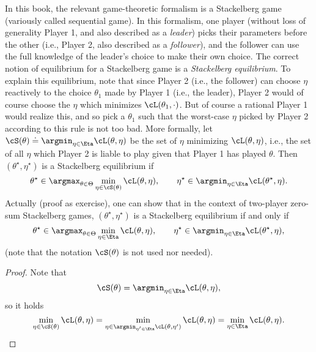 \documentclass[../../book-main.tex]{subfiles}
\begin{document}
In this book, the relevant game-theoretic formalism is a Stackelberg game (variously called sequential game). In this formalism, one player (without loss of generality Player 1, and also described as a \textit{leader}) picks their parameters before the other (i.e., Player 2, also described as a \textit{follower}), and the follower can use the full knowledge of the leader's choice to make their own choice. The correct notion of equilibrium for a Stackelberg game is a \textit{Stackelberg equilibrium}. To explain this equilibrium, note that since Player 2 (i.e., the follower) can choose \(\eta\) reactively to the choice \(\theta_{1}\) made by Player 1 (i.e., the leader), Player 2 would of course choose the \(\eta\) which minimizes \(\cL(\theta_{1}, \cdot)\). But of course a rational Player 1 would realize this, and so pick a \(\theta_{1}\) such that the worst-case \(\eta\) picked by Player 2 according to this rule is not too bad. More formally, let \(\cS(\theta) \doteq \argmin_{\eta \in \Eta}\cL(\theta, \eta)\) be the set of \(\eta\) minimizing \(\cL(\theta, \eta)\), i.e., the set of all \(\eta\) which Player 2 is liable to play given that Player 1 has played \(\theta\). Then \((\theta^{\star}, \eta^{\star})\) is a Stackelberg equilibrium if 
\begin{equation}
    \theta^{\star} \in \argmax_{\theta \in \Theta}\min_{\eta \in \cS(\theta)}\cL(\theta, \eta), \qquad \eta^{\star} \in \argmin_{\eta  \in \Eta}\cL(\theta^{\star}, \eta).
\end{equation}
Actually (proof as exercise), one can show that in the context of two-player zero-sum Stackelberg games, \((\theta^{\star}, \eta^{\star})\) is a Stackelberg equilibrium if and only if
\begin{equation}
    \theta^{\star} \in \argmax_{\theta \in \Theta}\min_{\eta \in \Eta}\cL(\theta, \eta), \qquad \eta^{\star} \in \argmin_{\eta  \in \Eta}\cL(\theta^{\star}, \eta),
\end{equation}
(note that the notation \(\cS(\theta)\) is not used nor needed). 
\begin{proof} %
    Note that 
    \begin{equation}
        \cS(\theta) = \argmin_{\eta \in \Eta}\cL(\theta, \eta),
    \end{equation}
    so it holds 
    \begin{equation}
        \min_{\eta \in \cS(\theta)}\cL(\theta, \eta) = \min_{\eta \in \argmin_{\eta^{\prime} \in \Eta}\cL(\theta, \eta^{\prime})}\cL(\theta, \eta) = \min_{\eta \in \Eta}\cL(\theta, \eta).
    \end{equation}
\end{proof}
\end{document}
